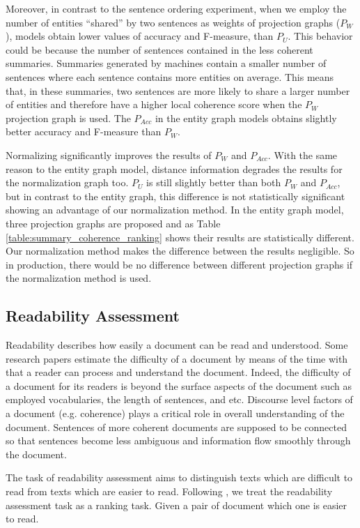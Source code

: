 Moreover, in contrast to the sentence ordering experiment, when we employ the number of entities ``shared” by two sentences as weights of projection graphs ($P_W$), models obtain lower values of accuracy and F-measure, than $P_U$. 
This behavior could be because the number of sentences contained in the less coherent summaries. 
Summaries generated by machines contain a smaller number of sentences where each sentence contains more entities on average. 
This means that, in these summaries, two sentences are more likely to share a larger number of entities and therefore have a
higher local coherence score when the $P_W$ projection graph is used.  
The $P_{Acc}$ in the entity graph models obtains slightly better accuracy and F-measure than $P_W$. 


Normalizing significantly improves the results of $P_W$  and $P_{Acc}$. 
With the same reason to the entity graph model, distance information degrades the results for the normalization graph too. 
$P_U$ is still slightly better than both $P_W$ and $P_{Acc}$, but in contrast to the entity graph, this difference is not statistically significant showing an advantage of our normalization method. 
In the entity graph model, three projection graphs are proposed and as Table \ref{table:summary_coherence_ranking} shows their results are statistically different. 
Our normalization method makes the difference between the results negligible. 
So in production, there would be no difference between different projection graphs if the normalization method is used. 



\subsection{Readability Assessment}
%
Readability describes how easily a document can be read and understood. 
Some research papers \cite{} estimate the difficulty of a document by means of the time with that a reader can process and understand the document. 
Indeed, the difficulty of a document for its readers is beyond the surface aspects of the document such as employed vocabularies, the length of sentences, and etc. 
Discourse level factors of a document (e.g. coherence) plays a critical role in overall understanding of the document. 
Sentences of more coherent documents are supposed to be connected so that sentences become less ambiguous and information flow smoothly through the document. 

The task of readability assessment aims to distinguish texts which are difficult to read from texts which are easier to read. 
Following \cite{guinaudeau13}, we treat the readability assessment task as a ranking task.
Given a pair of document which one is easier to read. 

